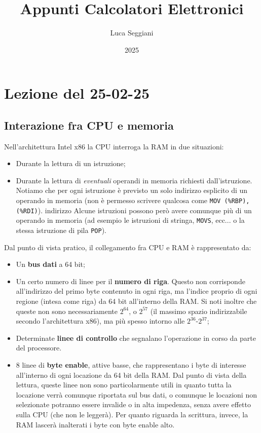 \documentclass[a4paper,11pt]{article}
\title{Appunti Calcolatori Elettronici}
\author{Luca Seggiani}
\date{2025}
\begin{document}
\section{Lezione del 25-02-25}

\thispagestyle{empty}
\pagestyle{fancy}

\subsection{Interazione fra CPU e memoria}
Nell'architettura Intel x86 la CPU interroga la RAM in due situazioni:
\begin{itemize}
	\item Durante la lettura di un istruzione;
	\item Durante la lettura di \textit{eventuali} operandi in memoria richiesti dall'istruzione.
		Notiamo che per ogni istruzione è previsto un solo indirizzo esplicito di un operando in memoria (non è permesso scrivere qualcosa come \lstinline|MOV (%RBP), (%RDI)|). indirizzo
		Alcune istruzioni possono però avere comunque più di un operando in memoria (ad esempio le istruzioni di stringa, \lstinline|MOVS|, ecc... o la stessa istruzione di pila \lstinline|POP|).
\end{itemize}

Dal punto di vista pratico, il collegamento fra CPU e RAM è rappresentato da:
\begin{itemize}
	\item Un \textbf{bus dati} a 64 bit;
	\item Un certo numero di linee per il \textbf{numero di riga}. Questo non corrisponde all'indirizzo del primo byte contenuto in ogni riga, ma l'indice proprio di ogni regione (intesa come riga) da 64 bit all'interno della RAM. Si noti inoltre che queste non sono necessariamente $2^{64}$, o $2^{57}$ (il massimo spazio indirizzabile secondo l'architettura x86), ma più spesso intorno alle $2^{36}$-$2^{37}$;
	\item Determinate \textbf{linee di controllo} che segnalano l'operazione in corso da parte del processore.
	\item 8 linee di \textbf{byte enable}, attive basse, che rappresentano i byte di interesse all'interno di ogni locazione da 64 bit della RAM. Dal punto di vista della lettura, queste linee non sono particolarmente utili in quanto tutta la locazione verrà comunque riportata sul bus dati, o comunque le locazioni non selezionate potranno essere invalide o in alta impedenza, senza avere effetto sulla CPU (che non le leggerà). Per quanto riguarda la scrittura, invece, la RAM lascerà inalterati i byte con byte enable alto. 
\end{itemize}
\end{document}
